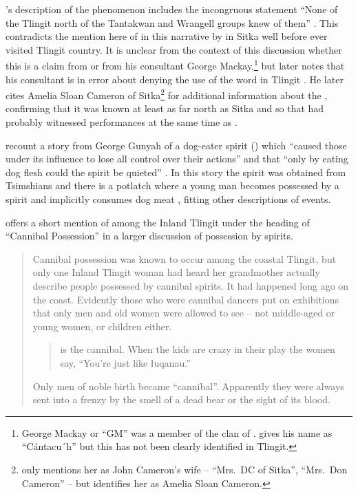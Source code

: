 \citeauthor{olson:1967}’s description of the  phenomenon includes the incongruous statement “None of the Tlingit north of the Tantakwan and Wrangell groups knew of them” \parencite[98]{olson:1967}.
This contradicts the mention here of  in this narrative by  in Sitka well before \citeauthor{olson:1967} ever visited Tlingit country.
It is unclear from the context of this discussion whether this is a claim from \citeauthor{olson:1967} or from his consultant George Mackay,\footnote{George Mackay or “GM” was a member of the  clan of  \parencite[82–83]{olson:1967}.
\citeauthor{olson:1967} gives his name as “Cántacu´h” \parencite[98]{olson:1967} but this has not been clearly identified in Tlingit.} but later \citeauthor{olson:1967} notes that his consultant is in error about denying the use of the word  in Tlingit \parencite[100]{olson:1967}.
He later cites  Amelia Sloan Cameron of Sitka\footnote{\citeauthor{olson:1967} only mentions her as  John Cameron’s wife – “Mrs.\ DC of Sitka”, “Mrs.\ Don Cameron” – but \textcite[130]{jones:2017} identifies her as  Amelia Sloan Cameron.} for additional information about the , confirming that it was known at least as far north as Sitka and so that  had probably witnessed  performances at the same time as .

\citeauthor{garfield-forrest:1948} recount a story from  George Gunyah of a dog-eater spirit () which “caused those under its influence to lose all control over their actions” and that “only by eating dog flesh could the spirit be quieted” \parencite[143]{garfield-forrest:1948}.
In this story the spirit was obtained from Tsimshians and there is a potlatch where a young man becomes possessed by a spirit and implicitly consumes dog meat \parencite[141–145]{garfield-forrest:1948}, fitting other descriptions of  events.

\citeauthor{mcclellan:1975b} offers a short mention of  among the Inland Tlingit under the heading of “Cannibal Possession” in a larger discussion of possession by spirits.

\begin{quote}\small
Cannibal possession was known to occur among the coastal Tlingit, but only one Inland Tlingit woman had heard her grandmother actually describe people possessed by cannibal spirits.
It had happened long ago on the coast.
Evidently those who were cannibal dancers put on exhibitions that only men and old women were allowed to see – not middle-aged or young women, or children either.

\begin{quote}
 is the cannibal.
When the kids are crazy in their play the women say, “You’re just like łuqanau.”
\end{quote}

Only men of noble birth became “cannibal”.
Apparently they were always sent into a frenzy by the smell of a dead bear or the sight of its blood.
\end{quote}

